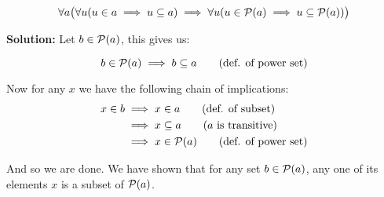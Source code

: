 \documentclass{article}
\begin{document}
$$\forall a\big(\forall u(u\in a\implies u\subseteq a)\implies\forall u(u\in\mathcal P(a)\implies u\subseteq\mathcal P(a))\big)$$

\noindent\textbf{Solution:} Let $b\in\mathcal P(a)$, this gives us:

\begin{equation}
b\in\mathcal P(a)\implies b\subseteq a\tag{def. of power set}    
\end{equation}

Now for any $x$ we have the following chain of implications:
\begin{align*}
x\in b&\implies x\in a\tag{def. of subset}\\
&\implies x\subseteq a\tag{$a$ is transitive}\\
&\implies x\in\mathcal P(a)\tag{def. of power set}
\end{align*}

And so we are done. We have shown that for any set $b\in\mathcal P(a)$, any one of its elements $x$ is a subset of $\mathcal P(a)$.
\end{document}
